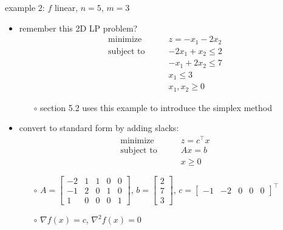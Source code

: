 \documentclass[10pt,hyperref,dvipsnames]{beamer}
\newcommand{\grad}{\nabla}
\newcommand{\ds}{\displaystyle}
\begin{document}
\begin{frame}{example 2: $f$ linear, $n=5$, $m=3$}

\begin{itemize}
\item remember this 2D LP problem?
\begin{equation*}
\begin{matrix}
\text{minimize} \qquad & z = -x_1 - 2x_2 \\
\text{subject to} \qquad & -2x_1 + x_2 \le 2 \\
 & -x_1 + 2x_2 \le 7 \\
 & x_1 \le 3 \\
 & x_1, x_2 \ge 0
\end{matrix}
\end{equation*}

    \begin{itemize}
    \item[$\circ$] section 5.2 uses this example to introduce the simplex method
    \end{itemize}

\medskip
\item convert to standard form by adding slacks:
\begin{equation*}
\begin{matrix}
\text{minimize} \qquad & z = c^\top x \\
\text{subject to} \qquad & A x = b \\
 & x \ge 0
\end{matrix}
\end{equation*}

    \begin{itemize}
    \item[$\circ$] $\ds A = \begin{bmatrix} -2 & 1 & 1 & 0 & 0 \\ -1 & 2 & 0 & 1 & 0 \\ 1 & 0 & 0 & 0 & 1 \end{bmatrix}$, $\ds b = \begin{bmatrix} 2 \\ 7 \\ 3 \end{bmatrix}$, $c = \begin{bmatrix} -1 & -2 & 0 & 0 & 0 \end{bmatrix}^\top$
    \item[$\circ$] $\grad f(x) = c$, \quad $\grad^2 f(x)=0$
    \end{itemize}
\end{itemize}
\end{frame}
\end{document}
